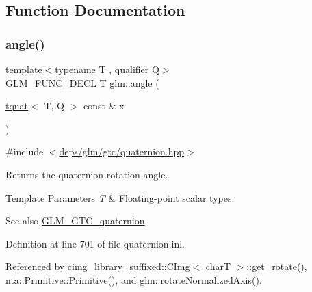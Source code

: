 \subsection{Function Documentation}
\mbox{\label{group__gtc__quaternion_gaaee6c856cae3217d274a240238cb6373}} 
\subsubsection{\texorpdfstring{angle()}{angle()}}
{\footnotesize\ttfamily template$<$typename T , qualifier Q$>$ \\
G\+L\+M\+\_\+\+F\+U\+N\+C\+\_\+\+D\+E\+CL T glm\+::angle (\begin{DoxyParamCaption}\item[{\hyperlink{structglm_1_1tquat}{tquat}$<$ T, Q $>$ const \&}]{x }\end{DoxyParamCaption})}



{\ttfamily \#include $<$\hyperlink{gtc_2quaternion_8hpp}{deps/glm/gtc/quaternion.\+hpp}$>$}

Returns the quaternion rotation angle.


\begin{DoxyTemplParams}{Template Parameters}
{\em T} & Floating-\/point scalar types.\\
\hline
\end{DoxyTemplParams}
\begin{DoxySeeAlso}{See also}
\hyperlink{group__gtc__quaternion}{G\+L\+M\+\_\+\+G\+T\+C\+\_\+quaternion} 
\end{DoxySeeAlso}


Definition at line 701 of file quaternion.\+inl.



Referenced by cimg\+\_\+library\+\_\+suffixed\+::\+C\+Img$<$ char\+T $>$\+::get\+\_\+rotate(), nta\+::\+Primitive\+::\+Primitive(), and glm\+::rotate\+Normalized\+Axis().

